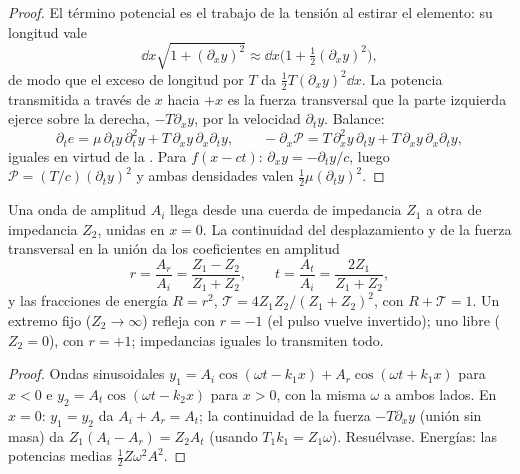 \begin{proof}
El término potencial es el trabajo de la tensión al estirar el elemento:
su longitud vale
\[
\dd x\sqrt{1 + (\partial_xy)^2} \approx \dd x\bigl(1 + \tfrac12(\partial_xy)^2\bigr) ,
\]
de modo que el exceso de longitud por $T$ da $\tfrac12T(\partial_xy)^2\dd x$. La
potencia transmitida a través de $x$ hacia $+x$ es la fuerza transversal
que la parte izquierda ejerce sobre la derecha, $-T\partial_xy$, por la velocidad
$\partial_ty$. Balance:
\[
\partial_te = \mu\,\partial_ty\,\partial_t^2y + T\,\partial_xy\,\partial_x\partial_ty ,
\qquad
-\partial_x\mathcal P = T\,\partial_x^2y\,\partial_ty + T\,\partial_xy\,\partial_x\partial_ty ,
\]
iguales en virtud de la . Para $f(x - ct)$: $\partial_xy = -\partial_ty/c$, luego $\mathcal P = (T/c)
(\partial_ty)^2$ y ambas densidades valen $\tfrac12\mu(\partial_ty)^2$.
\end{proof}

\begin{proposition}\label{prop:b2:waves-on-strings:junction}
Una onda de amplitud $A_i$ llega desde una cuerda de impedancia $Z_1$ a
otra de impedancia $Z_2$, unidas en $x = 0$. La continuidad del
desplazamiento y de la fuerza transversal en la unión da los coeficientes
en amplitud
\[
r = \frac{A_r}{A_i} = \frac{Z_1 - Z_2}{Z_1 + Z_2} , \qquad
t = \frac{A_t}{A_i} = \frac{2Z_1}{Z_1 + Z_2} ,
\]
y las fracciones de energía $R = r^2$, $\mathcal T = 4Z_1Z_2/(Z_1 + Z_2)^2$, con
$R + \mathcal T = 1$. Un extremo fijo ($Z_2 \to \infty$) refleja con $r = -1$
(el pulso vuelve invertido); uno libre ($Z_2 = 0$), con $r = +1$;
impedancias iguales lo transmiten todo.
\end{proposition}

\begin{proof}
Ondas sinusoidales $y_1 = A_i\cos(\omega t - k_1x) + A_r\cos(\omega t + k_1x)$ para
$x < 0$ e $y_2 = A_t\cos(\omega t - k_2x)$ para $x > 0$, con la misma $\omega$ a ambos
lados. En $x = 0$: $y_1 = y_2$ da $A_i + A_r = A_t$; la continuidad de la fuerza $-T\partial_xy$
(unión sin masa) da $Z_1(A_i - A_r) = Z_2A_t$ (usando
$T_1k_1 = Z_1\omega$). Resuélvase. Energías: las potencias medias $\tfrac12Z\omega^2A^2$.
\end{proof}

